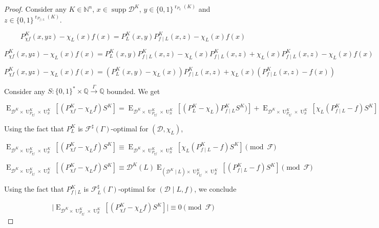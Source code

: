 \documentclass[11pt]{article}
\numberwithin{equation}{section}
\theoremstyle{definition}
\theoremstyle{plain}
\newcommand{\Bool}{\{0,1\}}
\newcommand{\Words}{{\Bool^*}}
\DeclareMathOperator{\Supp}{supp}
\DeclareMathOperator{\E}{E}
\DeclareMathOperator{\R}{r}
\DeclareMathOperator{\Un}{U}
\newcommand{\Nats}{\mathbb{N}}
\newcommand{\Rats}{\mathbb{Q}}
\newcommand{\Abs}[1]{\lvert #1 \rvert}
\newcommand{\Dist}{\mathcal{D}}
\newcommand{\Fall}{\mathcal{F}}
\newcommand{\ESG}{\Fall^\sharp(\Gamma)}
\newcommand{\BoolR}[1]{\Bool^{\R_{#1}(K)}}
\newcommand{\Scheme}{\xrightarrow{\Gamma}}
\begin{document}
\begin{proof}

Consider any $K \in \Nats^n$, $x \in \Supp \Dist^{K}$, $y \in \BoolR{P_L}$ and $z \in \BoolR{P_{f \mid L}}$.

\[P_{\chi f}^K(x,yz) - \chi_L(x) f(x) = P_L^K(x,y) P_{f \mid L}^K(x,z) - \chi_L(x) f(x)\]

\[P_{\chi f}^K(x,yz) - \chi_L(x) f(x) = P_L^K(x,y) P_{f \mid L}^K(x,z) - \chi_L(x) P_{f \mid L}^K(x,z) + \chi_L(x) P_{f \mid L}^K(x,z) - \chi_L(x) f(x)\]

\[P_{\chi f}^K(x,yz) - \chi_L(x) f(x) = (P_L^K(x,y) - \chi_L(x)) P_{f \mid L}^K(x,z) + \chi_L(x) (P_{f \mid L}^K(x,z) - f(x))\]

Consider any $S: \Words \times \Rats \Scheme \Rats$ bounded. We get

\[\E_{\Dist^{K} \times \Un_{P_{\chi f}}^K \times \Un_S^K}[(P_{\chi f}^K - \chi_L f)S^K] = \E_{\Dist^{K} \times \Un_{P_{\chi f}}^K \times \Un_S^K}[(P_L^K - \chi_L) P_{f \mid L}^KS^K)] + \E_{\Dist^{K} \times \Un_{P_{\chi f}}^K \times \Un_S^K}[\chi_L (P_{f \mid L}^K - f)S^K]\]

Using the fact that $P_L^K$ is $\ESG$-optimal for $(\Dist,\chi_L)$,

\[\E_{\Dist^{K} \times \Un_{P_{\chi f}}^K \times \Un_S^K}[(P_{\chi f}^K - \chi_L f)S^K] \equiv  \E_{\Dist^{K} \times \Un_{P_{\chi f}}^K \times \Un_S^K}[\chi_L (P_{f \mid L}^K - f)S^K] \pmod \Fall\]

\[\E_{\Dist^{K} \times \Un_{P_{\chi f}}^K \times \Un_S^K}[(P_{\chi f}^K - \chi_L f)S^K] \equiv \Dist^{K}(L)  \E_{(\Dist^{K} \mid L) \times \Un_{P_{\chi f}}^K \times \Un_S^K}[(P_{f \mid L}^K - f)S^K] \pmod \Fall\]
 
Using the fact that $P_{f \mid L}^K$ is $\Fall_L^\sharp(\Gamma)$-optimal for $(\Dist \mid L, f)$, we conclude
 
 \[\Abs{\E_{\Dist^{K} \times \Un_{P_{\chi f}}^K \times \Un_S^K}[(P_{\chi f}^K - \chi_L f)S^K]} \equiv 0 \pmod \Fall\]
%
\end{proof}
 
\end{document}
